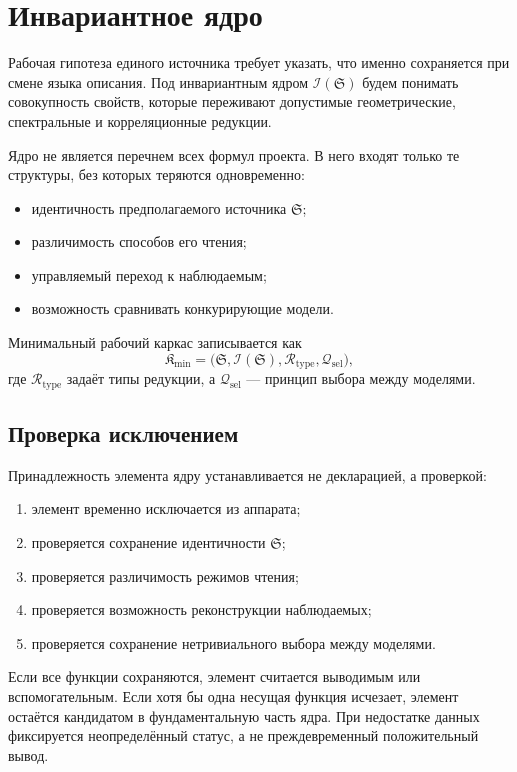 \chapter{Инвариантное ядро}

Рабочая гипотеза единого источника требует указать, что именно сохраняется
при смене языка описания. Под инвариантным ядром $\mathcal I(\mathfrak S)$
будем понимать совокупность свойств, которые переживают допустимые
геометрические, спектральные и корреляционные редукции.

Ядро не является перечнем всех формул проекта. В него входят только те
структуры, без которых теряются одновременно:
\begin{itemize}
 \item идентичность предполагаемого источника $\mathfrak S$;
 \item различимость способов его чтения;
 \item управляемый переход к наблюдаемым;
 \item возможность сравнивать конкурирующие модели.
\end{itemize}

Минимальный рабочий каркас записывается как
\begin{equation}
 \mathfrak K_{\min}=
 \bigl(\mathfrak S,\mathcal I(\mathfrak S),
 \mathcal R_{\mathrm{type}},\mathcal Q_{\mathrm{sel}}\bigr),
\end{equation}
где $\mathcal R_{\mathrm{type}}$ задаёт типы редукции, а
$\mathcal Q_{\mathrm{sel}}$ --- принцип выбора между моделями.

\section{Проверка исключением}

Принадлежность элемента ядру устанавливается не декларацией, а проверкой:
\begin{enumerate}
 \item элемент временно исключается из аппарата;
 \item проверяется сохранение идентичности $\mathfrak S$;
 \item проверяется различимость режимов чтения;
 \item проверяется возможность реконструкции наблюдаемых;
 \item проверяется сохранение нетривиального выбора между моделями.
\end{enumerate}

Если все функции сохраняются, элемент считается выводимым или вспомогательным.
Если хотя бы одна несущая функция исчезает, элемент остаётся кандидатом в
фундаментальную часть ядра. При недостатке данных фиксируется неопределённый
статус, а не преждевременный положительный вывод.

